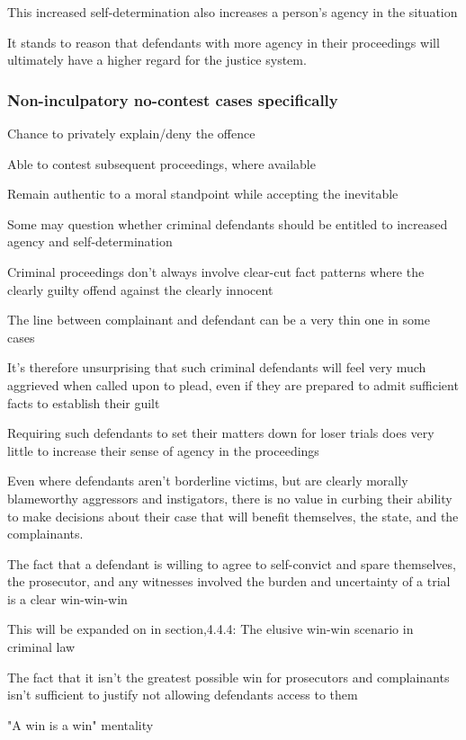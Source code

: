 This increased self-determination also increases a person's agency in the situation

It stands to reason that defendants with more agency in their proceedings will ultimately have a higher regard for the justice system.

\subsubsection{Non-inculpatory no-contest cases specifically}

Chance to privately explain/deny the offence

Able to contest subsequent proceedings, where available

Remain authentic to a moral standpoint while accepting the inevitable

Some may question whether criminal defendants should be entitled to increased agency and self-determination

Criminal proceedings don't always involve clear-cut fact patterns where the clearly guilty offend against the clearly innocent

The line between complainant and defendant can be a very thin one in some cases

It's therefore unsurprising that such criminal defendants will feel very much aggrieved when called upon to plead, even if they are prepared to admit sufficient facts to establish their guilt

Requiring such defendants to set their matters down for loser trials does very little to increase their sense of agency in the proceedings

Even where defendants aren't borderline victims, but are clearly morally blameworthy aggressors and instigators, there is no value in curbing their ability to make decisions about their case that will benefit themselves, the state, and the complainants.

The fact that a defendant is willing to agree to self-convict and spare themselves, the prosecutor, and any witnesses involved the burden and uncertainty of a trial is a clear win-win-win

This will be expanded on in section,4.4.4: The elusive win-win scenario in criminal law

The fact that it isn't the greatest possible win for prosecutors and complainants isn't sufficient to justify not allowing defendants access to them

"A win is a win" mentality

